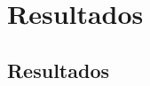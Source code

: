 \chapter{Resultados}\label{sec:Resultados}
\thispagestyle{empty}

\begingroup
{}
\small

\endgroup

\section{Resultados}
